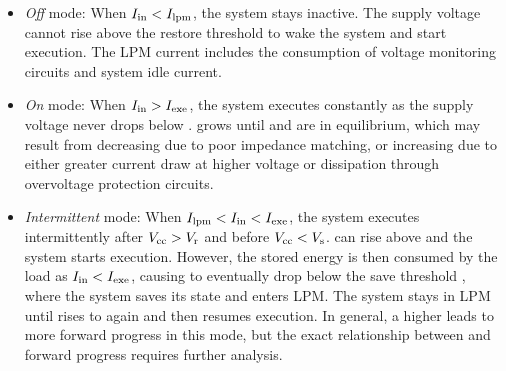 \begin{itemize}
	\item \textit{Off} mode: When $I_{\text{in}} < I_{\text{lpm}}$, the system stays inactive. 
    The supply voltage  cannot rise above the restore threshold  to wake the system and start execution. 
    The LPM current  includes the consumption of voltage monitoring circuits and system idle current.

    \item \textit{On} mode: When $I_{\text{in}} > I_{\text{exe}}$, the system executes constantly as the supply voltage  never drops below . 
     grows until  and  are in equilibrium, which may result from  decreasing due to poor impedance matching, or  increasing due to either greater current draw at higher voltage or dissipation through overvoltage protection circuits. 

	\item \textit{Intermittent} mode: When $I_{\text{lpm}} < I_{\text{in}} < I_{\text{exe}}$, the system executes intermittently after $V_{\text{cc}} > V_{\text{r}}$ and before $V_{\text{cc}} < V_{\text{s}}$.  can rise above  and the system starts execution. 
	However, the stored energy is then consumed by the load as $I_{\text{in}} < I_{\text{exe}}$, causing  to eventually drop below the save threshold , where the system saves its state and enters LPM. 
	The system stays in LPM until  rises to  again and then resumes execution. 
    In general, a higher  leads to more forward progress in this mode, but the exact relationship between  and forward progress requires further analysis.
    
\end{itemize}

